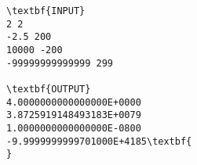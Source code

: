 \begin{verbatim}
\textbf{INPUT}
2 2
-2.5 200
10000 -200
-99999999999999 299

\textbf{OUTPUT}
4.0000000000000000E+0000
3.8725919148493183E+0079
1.0000000000000000E-0800
-9.9999999999701000E+4185\textbf{        
}\end{verbatim}